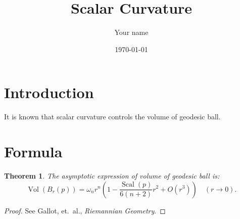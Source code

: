 \documentclass{article}
\title{Scalar Curvature}
\author{Your name}
\date{\today}
\theoremstyle{plain}
\newtheorem{theorem}{Theorem}
\begin{document}
\maketitle
\section{Introduction}
It is known that scalar curvature controls the volume of geodesic ball.

\section{Formula}
\begin{theorem}
    The asymptotic expression of volume of geodesic ball is:
    \[\operatorname{Vol}(B_r(p))=\omega_nr^n\left(1-\frac{\operatorname{Scal}(p)}{6(n+2)}r^2+O(r^3)\right)\quad(r\to 0).\]
\end{theorem}
\begin{proof}
    See Gallot, et.\ al., \emph{Riemannian Geometry}.
\end{proof}
\end{document}
